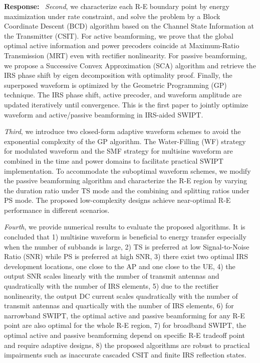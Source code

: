 \documentclass{article}
\newcounter{reviewer}
\newcounter{point}[reviewer]
\newcounter{response}[reviewer]
\newenvironment{response}
	{\refstepcounter{response} \medskip \noindent \textbf{Response:}\ }
	{\medskip}
\begin{document}
\begin{reviewer}
\begin{response}
			\emph{Second}, we characterize each R-E boundary point by energy maximization under rate constraint, and solve the problem by a Block Coordinate Descent (BCD) algorithm based on the Channel State Information at the Transmitter (CSIT). For active beamforming, we prove that the global optimal active information and power precoders coincide at Maximum-Ratio Transmission (MRT) even with rectifier nonlinearity. For passive beamforming, we propose a Successive Convex Approximation (SCA) algorithm and retrieve the IRS phase shift by eigen decomposition with optimality proof. Finally, the superposed waveform is optimized by the Geometric Programming (GP) technique. The IRS phase shift, active precoder, and waveform amplitude are updated iteratively until convergence. This is the first paper to jointly optimize waveform and active/passive beamforming in IRS-aided SWIPT.

			\emph{Third}, we introduce two closed-form adaptive waveform schemes to avoid the exponential complexity of the GP algorithm. The Water-Filling (WF) strategy for modulated waveform and the SMF strategy for multisine waveform are combined in the time and power domains to facilitate practical SWIPT implementation. To accommodate the suboptimal waveform schemes, we modify the passive beamforming algorithm and characterize the R-E region by varying the duration ratio under TS mode and the combining and splitting ratios under PS mode. The proposed low-complexity designs achieve near-optimal R-E performance in different scenarios.

			\emph{Fourth}, we provide numerical results to evaluate the proposed algorithms. It is concluded that 1) multisine waveform is beneficial to energy transfer especially when the number of subbands is large, 2) TS is preferred at low Signal-to-Noise Ratio (SNR) while PS is preferred at high SNR, 3) there exist two optimal IRS development locations, one close to the AP and one close to the UE, 4) the output SNR scales linearly with the number of transmit antennas and quadratically with the number of IRS elements, 5) due to the rectifier nonlinearity, the output DC current scales quadratically with the number of transmit antennas and quartically with the number of IRS elements, 6) for narrowband SWIPT, the optimal active and passive beamforming for any R-E point are also optimal for the whole R-E region, 7) for broadband SWIPT, the optimal active and passive beamforming depend on specific R-E tradeoff point and require adaptive designs, 8) the proposed algorithms are robust to practical impairments such as inaccurate cascaded CSIT and finite IRS reflection states.
			\label{re:3.2}
		\end{response}


\end{reviewer}
\end{document}

